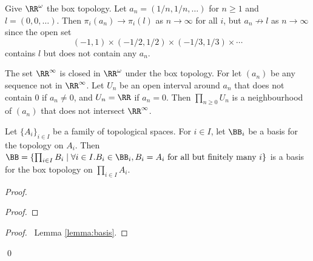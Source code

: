 \begin{example}
    Give $\RR^\omega$ the box topology. Let $a_n = (1/n, 1/n, \ldots)$ for $n \geq 1$ and $l = (0, 0, \ldots)$. Then $\pi_i(a_n) \rightarrow \pi_i(l)$
    as $n \rightarrow \infty$ for all $i$, but $a_n \not\rightarrow l$ as $n \rightarrow \infty$ since the open set
    \[ (-1,1) \times (-1/2, 1/2) \times (-1/3,1/3) \times \cdots \]
    contains $l$ but does not contain any $a_n$.
\end{example}

\begin{example}
    The set $\RR^\infty$ is closed in $\RR^\omega$ under the box topology. For let $(a_n)$ be any sequence not in $\RR^\infty$.
    Let $U_n$ be an open interval around $a_n$ that does not contain $0$ if $a_n \neq 0$, and $U_n = \RR$ if $a_n = 0$.
    Then $\prod_{n \geq 0} U_n$ is a neighbourhood of $(a_n)$ that does not intersect $\RR^\infty$.
\end{example}

\begin{proposition}
    Let $\{ A_i \}_{i \in I}$ be a family of topological spaces. For $i \in I$, let $\BB_i$ be a basis for the topology on $A_i$. Then $\BB = \{ \prod_{i \in I} B_i \mid
    \forall i \in I. B_i \in \BB_i, B_i = A_i \text{ for all but finitely many } i \}$ is a basis for the box topology on $\prod_{i \in I} A_i$.
\end{proposition}

\begin{proof}
    \pf
    \begin{proof}
    \end{proof}
    \qedstep
    \begin{proof}
        \pf\ Lemma \ref{lemma:basis}.
    \end{proof}
    \qed
\end{proof}

